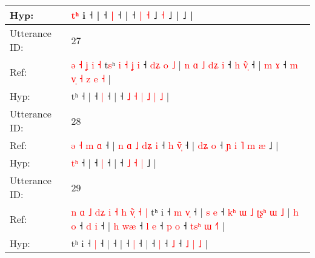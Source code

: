 \documentclass[10pt]{article}
\DeclareRobustCommand{\hl}[1]{{\textcolor{red}{#1}}}
\begin{document}
\begin{longtable}{ll}
 \\
Hyp: & \hl{}\hl{}\hl{}\hl{}\hl{}\hl{}\hl{}\hl{}\hl{}\hl{}\hl{}\hl{}\hl{}\hl{}\hl{}\hl{}\hl{}\hl{}\hl{}\hl{}\hl{}\hl{}\hl{}\hl{}\hl{}\hl{}\hl{}\hl{}\hl{}\hl{}\hl{}\hl{}\hl{t}\hl{ʰ} i ˧\hl{}\hl{}\hl{}\hl{}\hl{}\hl{}\hl{}\hl{}\hl{}\hl{}\hl{}\hl{} |\hl{}\hl{}\hl{}\hl{}\hl{}\hl{}\hl{}\hl{}\hl{}\hl{}\hl{} ˧\hl{}\hl{} \hl{}\hl{}\hl{|} ˧ |\hl{}\hl{}\hl{}\hl{}\hl{} ˧ \hl{|} \hl{˧} ˩\hl{}\hl{} \hl{˧} ˩ |\hl{}\hl{}\hl{}\hl{}\hl{}\hl{}\hl{}\hl{} ˩ |
 \\
\midrule
Utterance ID: & 27 \\
Ref: & \hl{ə}\hl{ }\hl{˧}\hl{ }\hl{ʝ}\hl{ }\hl{i}\hl{ }\hl{˧}\hl{ }t\hl{s}ʰ\hl{ }\hl{i}\hl{ }\hl{˧}\hl{ }\hl{ʝ}\hl{ }\hl{i} ˧\hl{ }\hl{d}\hl{ʑ}\hl{ }\hl{o}\hl{ }\hl{˩} |\hl{ }\hl{n}\hl{ }\hl{ɑ}\hl{ }\hl{˩}\hl{ }\hl{d}\hl{ʑ}\hl{ }\hl{i} ˧\hl{ }\hl{h} \hl{v}\hl{̃}\hl{̩} ˧ |\hl{ }\hl{m}\hl{ }\hl{ɤ} ˧ \hl{m} \hl{v}\hl{̩} \hl{˧} \hl{z} \hl{e} \hl{˧} |
 \\
Hyp: & \hl{}\hl{}\hl{}\hl{}\hl{}\hl{}\hl{}\hl{}\hl{}\hl{}t\hl{}ʰ\hl{}\hl{}\hl{}\hl{}\hl{}\hl{}\hl{}\hl{} ˧\hl{}\hl{}\hl{}\hl{}\hl{}\hl{}\hl{} |\hl{}\hl{}\hl{}\hl{}\hl{}\hl{}\hl{}\hl{}\hl{}\hl{}\hl{} ˧\hl{}\hl{} \hl{}\hl{}\hl{|} ˧ |\hl{}\hl{}\hl{}\hl{} ˧ \hl{˩} \hl{}\hl{˧} \hl{|} \hl{˩} \hl{|} \hl{˩} |
 \\
\midrule
Utterance ID: & 28 \\
Ref: & \hl{ə}\hl{ }\hl{˧}\hl{ }\hl{m}\hl{ }\hl{ɑ} ˧ |\hl{ }\hl{n}\hl{ }\hl{ɑ}\hl{ }\hl{˩}\hl{ }\hl{d}\hl{ʑ}\hl{ }\hl{i} ˧\hl{ }\hl{h} \hl{v}\hl{̃}\hl{̩} ˧ |\hl{ }\hl{d}\hl{ʑ}\hl{ }\hl{o} ˧\hl{ }\hl{ɲ}\hl{ }\hl{i} \hl{˥} \hl{m} \hl{æ} ˩ |
 \\
Hyp: & \hl{}\hl{}\hl{}\hl{}\hl{}\hl{t}\hl{ʰ} ˧ |\hl{}\hl{}\hl{}\hl{}\hl{}\hl{}\hl{}\hl{}\hl{}\hl{}\hl{} ˧\hl{}\hl{} \hl{}\hl{}\hl{|} ˧ |\hl{}\hl{}\hl{}\hl{}\hl{} ˧\hl{}\hl{}\hl{}\hl{} \hl{˩} \hl{˧} \hl{|} ˩ |
 \\
\midrule
Utterance ID: & 29 \\
Ref: & \hl{n}\hl{ }\hl{ɑ}\hl{ }\hl{˩}\hl{ }\hl{d}\hl{ʑ}\hl{ }\hl{i}\hl{ }\hl{˧}\hl{ }\hl{h}\hl{ }\hl{v}\hl{̃}\hl{̩}\hl{ }\hl{˧}\hl{ }\hl{|}\hl{ }tʰ i ˧\hl{ }\hl{m} \hl{v}\hl{̩} ˧ |\hl{ }\hl{s}\hl{ }\hl{e} ˧\hl{ }\hl{k}\hl{ʰ}\hl{ }\hl{ɯ}\hl{ }\hl{˩}\hl{ }\hl{ʈ}\hl{ʂ}\hl{ʰ}\hl{ }\hl{ɯ}\hl{ }\hl{˩} |\hl{ }\hl{h}\hl{ }\hl{o} ˧\hl{ }\hl{d} \hl{i} ˧ |\hl{ }\hl{h}\hl{ }\hl{w}\hl{æ} ˧\hl{ }\hl{l} \hl{e} ˧\hl{ }\hl{p} \hl{o} ˧ \hl{t}\hl{s}\hl{ʰ} \hl{ɯ} \hl{˧}\hl{˥} |
 \\
Hyp: & \hl{}\hl{}\hl{}\hl{}\hl{}\hl{}\hl{}\hl{}\hl{}\hl{}\hl{}\hl{}\hl{}\hl{}\hl{}\hl{}\hl{}\hl{}\hl{}\hl{}\hl{}\hl{}\hl{}tʰ i ˧\hl{}\hl{} \hl{}\hl{|} ˧ |\hl{}\hl{}\hl{}\hl{} ˧\hl{}\hl{}\hl{}\hl{}\hl{}\hl{}\hl{}\hl{}\hl{}\hl{}\hl{}\hl{}\hl{}\hl{}\hl{} |\hl{}\hl{}\hl{}\hl{} ˧\hl{}\hl{} \hl{|} ˧ |\hl{}\hl{}\hl{}\hl{}\hl{} ˧\hl{}\hl{} \hl{|} ˧\hl{}\hl{} \hl{˩} ˧ \hl{}\hl{}\hl{˩} \hl{|} \hl{}\hl{˩} |

\end{longtable}
\end{document}
